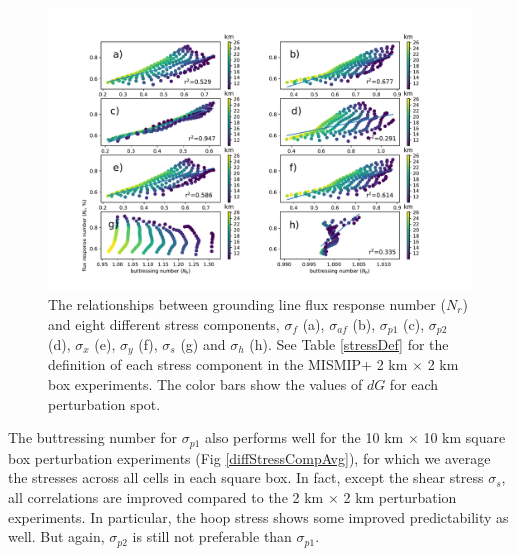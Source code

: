\documentclass[review,oneside]{igs}
\begin{document}
\begin{figure}
\centering
\includegraphics[width=1\linewidth]{figs/diffStressComp.pdf}
\caption{The relationships between grounding line flux response number ($N_r$) and eight different stress components, $\sigma_f$ (a), $\sigma_{af}$ (b), $\sigma_{p1}$ (c), $\sigma_{p2}$ (d), $\sigma_{x}$ (e), $\sigma_{y}$ (f), $\sigma_{s}$ (g) and $\sigma_h$ (h). See Table \ref{stressDef} for the definition of each stress component in the MISMIP+ 2 km $\times$ 2 km box experiments. The color bars show the values of $dG$ for each perturbation spot.}
\label{diffStressComp}
\end{figure}

The buttressing number for $\sigma_{p1}$ also performs well for the 10 km $\times$ 10 km square box perturbation experiments (Fig \ref{diffStressCompAvg}), for which we average the stresses across all cells in each square box. In fact, except the shear stress $\sigma_s$, all correlations are improved compared to the 2 km $\times$ 2 km perturbation experiments. In particular, the hoop stress shows some improved predictability as well. But again, $\sigma_{p2}$ is still not preferable than $\sigma_{p1}$.
\end{document}

